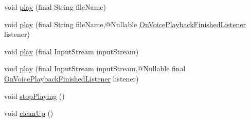\begin{DoxyCompactItemize}
\item 
void \hyperlink{classcom_1_1google_1_1devrel_1_1wcl_1_1widgets_1_1recording_1_1WclSoundManager_a4791f74632b8d507238939a257faa171}{play} (final String file\+Name)
\item 
void \hyperlink{classcom_1_1google_1_1devrel_1_1wcl_1_1widgets_1_1recording_1_1WclSoundManager_a317add68cb22329326bb8b01f8ed40d3}{play} (final String file\+Name,@Nullable \hyperlink{interfacecom_1_1google_1_1devrel_1_1wcl_1_1widgets_1_1recording_1_1WclSoundManager_1_1OnVoicePlaybackFinishedListener}{On\+Voice\+Playback\+Finished\+Listener} listener)
\item 
void \hyperlink{classcom_1_1google_1_1devrel_1_1wcl_1_1widgets_1_1recording_1_1WclSoundManager_a742b37a0c6e32dd8beb25ac011fd6502}{play} (final Input\+Stream input\+Stream)
\item 
void \hyperlink{classcom_1_1google_1_1devrel_1_1wcl_1_1widgets_1_1recording_1_1WclSoundManager_a90d24baed0b9dd197566d76d7d7ec29a}{play} (final Input\+Stream input\+Stream,@Nullable final \hyperlink{interfacecom_1_1google_1_1devrel_1_1wcl_1_1widgets_1_1recording_1_1WclSoundManager_1_1OnVoicePlaybackFinishedListener}{On\+Voice\+Playback\+Finished\+Listener} listener)
\item 
void \hyperlink{classcom_1_1google_1_1devrel_1_1wcl_1_1widgets_1_1recording_1_1WclSoundManager_a4cca65082543881b128de7d0e81b1fbc}{stop\+Playing} ()
\item 
void \hyperlink{classcom_1_1google_1_1devrel_1_1wcl_1_1widgets_1_1recording_1_1WclSoundManager_a1a8937a6d48db87007225c79e0ba9497}{clean\+Up} ()
\end{DoxyCompactItemize}
